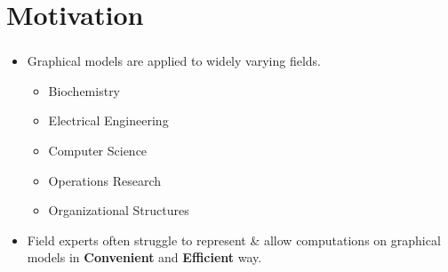 \documentclass[mathserif,10pt]{beamer}
\newcommand{\cmt}[1]{}
\begin{document}
\section{Motivation}
\frame
{
  \frametitle{\secname}
  \begin{itemize}[<+->]
    \item Graphical models are applied to widely varying fields.
    \begin{itemize}
      \item Biochemistry 
        \cmt{genomics}
      \item Electrical Engineering
        \cmt{communication networks }
      \item Computer Science
        \cmt{Algorithms and computation}
      \item Operations Research
        \cmt{Scheduling}
      \item Organizational Structures 
        \cmt{social networking}
    \end{itemize} 
    \vspace{1cm}
    \item Field experts often struggle to represent \& allow computations on  graphical models in \textbf{Convenient} and \textbf{Efficient} way.
      \cmt{
Convenience: is essential so that even for domain experts who are not coding experts
can code and reason about their implementation. Ease of interface could be due to:
– Expressive power of the language representing those models.
– Intuitive extensibility of the language.
– Ability of the language to provide exploratory programming, where the user may
experiment with different ideas (without dwelling much into the language syntax)
before coming to a conclusive one.

Designed language need to be efficient in the following sense.
– Underlying design decisions including data structures need to be carefully crafted to
achieve expected run-time w.r.t the input size.
– Implementation need to be scalable w.r.t the space/time requirements. This is im-
portant because most of the graph algorithm typically work on huge input sizes.

To meet all above goals and most importantly exploratory programming, we decided to work
on a dynamically typed language to represent graphs and apply various computations on them.
With a dynamically typed language the user do not have to worry much about declaring types
and can focus mostly on his/her experiments.
      }
    \vspace{1cm}
  \end{itemize} 
}
\end{document}
